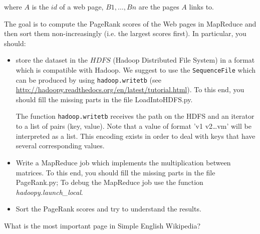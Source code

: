 \documentclass[pdftex,a4paper,DIV15]{scrartcl}
\begin{document}
where $A$ is the $id$ of a web page, $B1,\dots,Bn$ are the pages $A$ links to.

The goal is to compute the PageRank scores of the Web pages in MapReduce and then sort them non-increasingly (i.e. the largest scores first). In particular, you should:

\begin{itemize}
  \item store the dataset in the $HDFS$ (Hadoop Distributed File System) in a format which is compatible with Hadoop. We suggest to use the \texttt{SequenceFile} which can be produced by using \texttt{hadoop.writetb} (see \url{http://hadoopy.readthedocs.org/en/latest/tutorial.html}). To this end, you should fill the missing parts in the file LoadIntoHDFS.py. 
  
The function \texttt{hadoop.writetb} receives the path on the HDFS and an iterator to a list of pairs (key, value). Note that a value of format 'v1 v2\ldots vm' will be interpreted as a list. This encoding exists in order to deal with keys that have several corresponding values. 
\item Write a MapReduce job which implements the multiplication between matrices. To this end, you should fill the missing parts in the file PageRank.py; To debug the MapReduce job use the function \textit{hadoopy.launch\_local}.
\item Sort the PageRank scores and try to understand the results.   
\end{itemize}


What is the most important page in Simple English Wikipedia?
\end{document}

